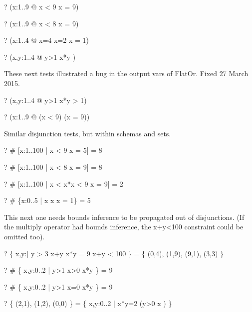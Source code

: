 \documentclass{article}
\begin{document}
\begin{zed} \vdash?       (\forall x:1..9 @ x < 9 \lor x = 9)      \end{zed}
\begin{zed} \vdash? \lnot (\forall x:1..9 @ x < 8 \lor x = 9)      \end{zed}
\begin{zed} \vdash? (\forall x:1..4       @ x=4 \lor x=2 \lor x  = 1)   \end{zed}
\begin{zed} \vdash? (\forall x,y:1..4     @ y>1 \lor x*y )   \end{zed}
These next tests illustrated a bug in the output vars of FlatOr. Fixed 27 March 2015.
\begin{zed} \vdash? (\forall x,y:1..4     @ y>1 \implies x*y > 1)  \end{zed}
\begin{zed} \vdash? (\forall x:1..9 @ \lnot \lnot (x < 9) \lor \lnot \lnot (x = 9)) \end{zed}

Similar disjunction tests, but within schemas and sets.
\begin{zed} \vdash? \# [x:1..100 | x < 9 \lor x = 5] = 8 \end{zed}
\begin{zed} \vdash? \# [x:1..100 | x < 8 \lor x = 9] = 8 \end{zed}
\begin{zed} \vdash? \# [x:1..100 | x < x*x < 9 \lor x = 9] = 2 \end{zed}
\begin{zed} \vdash? \# \{x:0..5 | x   \neq x \implies x  = 1\} = 5 \end{zed}

This next one needs bounds inference to be propagated out of disjunctions.
(If the multiply operator had bounds inference, the x+y<100 constraint could be omitted too).
\begin{zed} \vdash? \{ x,y:\nat | y > 3 \land x+y  \lor x*y = 9 \land x+y < 100 \} = \{ (0,4), (1,9), (9,1), (3,3) \} \end{zed}
\begin{zed} \vdash? \# \{ x,y:0..2 | y>1 \land x>0 \implies x*y  \} = 9 \end{zed}
\begin{zed} \vdash? \# \{ x,y:0..2 | \lnot y>1 \lor x=0 \lor x*y  \} = 9 \end{zed}
\begin{zed} \vdash? \{ (2,1), (1,2), (0,0) \} = \{ x,y:0..2 | x*y=2 \lor \lnot(y>0 \lor x ) \} \end{zed}
\end{document}
